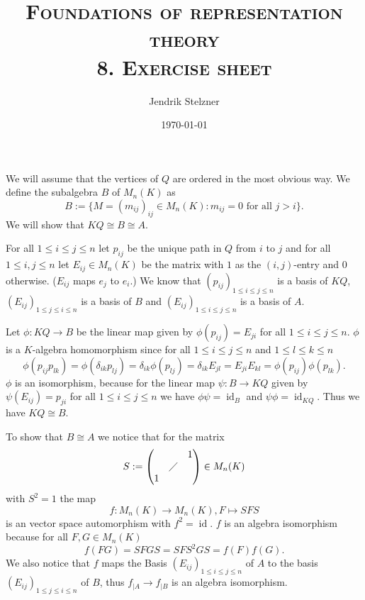 \documentclass[a4paper,10pt]{article}
\title{\textsc{Foundations of representation theory \\ \Large 8. Exercise sheet}}
\author{Jendrik Stelzner}
\date{\today}
\theoremstyle{definition}
\newcommand{\id}{\operatorname{id}}
\begin{document}
\maketitle





\section{}
We will assume that the vertices of $Q$ are ordered in the most obvious way. We define the subalgebra $B$ of $M_n(K)$ as
\[
 B := \{M = (m_{ij})_{ij} \in M_n(K) : m_{ij} = 0 \text{ for all } j > i \}.
\]
We will show that $KQ \cong B \cong A$.

For all $1 \leq i \leq j \leq n$  let $p_{ij}$ be the unique path in $Q$ from $i$ to $j$ and for all $1 \leq i, j \leq n$ let $E_{ij} \in M_n(K)$ be the matrix with $1$ as the $(i,j)$-entry and $0$ otherwise. ($E_{ij}$ maps $e_j$ to $e_i$.) We know that $(p_{ij})_{1 \leq i \leq j \leq n}$ is a basis of $KQ$, $(E_{ij})_{1 \leq j \leq i \leq n}$ is a basis of $B$ and $(E_{ij})_{1 \leq i \leq j \leq n}$ is a basis of $A$.

Let $\phi : KQ \rightarrow B$ be the linear map given by $\phi(p_{ij}) = E_{ji}$ for all $1 \leq i \leq j \leq n$. $\phi$ is a $K$-algebra homomorphism since for all $1 \leq i \leq j \leq n$ and $1 \leq l \leq k \leq n$
\begin{equation*}
 \phi(p_{ij} p_{lk})
 = \phi(\delta_{ik} p_{lj})
 = \delta_{ik} \phi(p_{lj})
 = \delta_{ik} E_{jl}
 = E_{ji} E_{kl}
 = \phi(p_{ij}) \phi(p_{lk}).
\end{equation*}
$\phi$ is an isomorphism, because for the linear map $\psi: B \rightarrow KQ$ given by $\psi(E_{ij}) = p_{ji}$ for all $1 \leq i \leq j \leq n$ we have $\phi \psi = \id_B$ and $\psi \phi = \id_{KQ}$. Thus we have $KQ \cong B$.

To show that $B \cong A$ we notice that for the matrix
\[
 S :=
 \begin{pmatrix}
    &         & 1 \\
    & \diagup &   \\
  1 &         & 
 \end{pmatrix}
 \in M_n(K)
\]
with $S^2 = 1$ the map
\[
 f : M_n(K) \rightarrow M_n(K), F \mapsto SFS
\]
is an vector space automorphism with $f^2 = \id$. $f$ is an algebra isomorphism because for all $F,G \in M_n(K)$
\[
 f(FG) = SFGS = SFS^2GS = f(F)f(G).
\]
We also notice that $f$ maps the Basis $(E_{ij})_{1 \leq i \leq j \leq n}$ of $A$ to the basis $(E_{ij})_{1 \leq j \leq i \leq n}$ of $B$, thus $f_{|A} \rightarrow f_{|B}$ is an algebra isomorphism.
\end{document}
